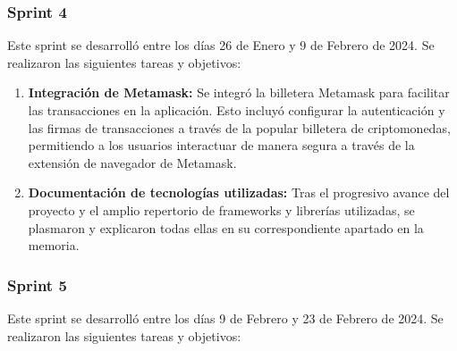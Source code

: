 \subsubsection{Sprint 4}

Este sprint se desarrolló entre los días 26 de Enero y 9 de Febrero de 2024. Se realizaron las siguientes tareas y objetivos:

\begin{enumerate}

\item \textbf{Integración de Metamask:} Se integró la billetera Metamask para facilitar las transacciones en la aplicación. Esto incluyó configurar la autenticación y las firmas de transacciones a través de la popular billetera de criptomonedas, permitiendo a los usuarios interactuar de manera segura a través de la extensión de navegador de Metamask.

\item \textbf{Documentación de tecnologías utilizadas:}  Tras el progresivo avance del proyecto y el amplio repertorio de frameworks y librerías utilizadas, se plasmaron y explicaron todas ellas en su correspondiente apartado en la memoria.

\end{enumerate}


\subsubsection{Sprint 5}

Este sprint se desarrolló entre los días 9 de Febrero y 23 de Febrero de 2024. Se realizaron las siguientes tareas y objetivos:

